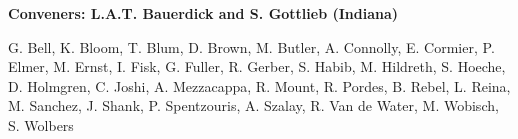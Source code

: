 

\begin{center}

\begin{large} {\bf Conveners: L.A.T. Bauerdick and S. Gottlieb (Indiana)}\end{large}

G. Bell,
K. Bloom,
T. Blum,
D. Brown,
M. Butler,
A. Connolly,
E. Cormier,
P. Elmer,
M. Ernst,
I. Fisk,
G. Fuller,
R. Gerber,
S. Habib,
M. Hildreth,
S. Hoeche,
D. Holmgren,
C. Joshi,
A. Mezzacappa,
R. Mount,
R. Pordes,
B. Rebel,
L. Reina,
M. Sanchez,
J. Shank,
P. Spentzouris,
A. Szalay,
R. Van de Water,
M. Wobisch,
S. Wolbers


\end{center}

